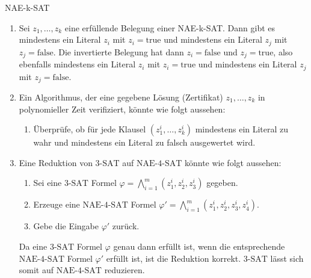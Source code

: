 \documentclass{article}
\begin{document}
\begin{exercise}{NAE-k-SAT}
  \begin{solution}
    \begin{enumerate}
      \item Sei $z_1, \ldots, z_k$ eine erfüllende Belegung einer NAE-k-SAT. Dann gibt es mindestens ein Literal $z_i$ mit $z_i = \text{true}$ und mindestens ein Literal $z_j$ mit $z_j = \text{false}$. Die invertierte Belegung hat dann $z_i = \text{false}$ und $z_j = \text{true}$, also ebenfalls mindestens ein Literal $z_i$ mit $z_i = \text{true}$ und mindestens ein Literal $z_j$ mit $z_j = \text{false}$.
      \item Ein Algorithmus, der eine gegebene Lösung (Zertifikat) $z_1, \ldots, z_k$ in polynomieller Zeit verifiziert, könnte wie folgt aussehen:
            \begin{enumerate}
              \item Überprüfe, ob für jede Klausel $(z_1^i, \dots, z_k^i)$ mindestens ein Literal zu wahr und mindestens ein Literal zu falsch ausgewertet wird.
            \end{enumerate}
      \item Eine Reduktion von $3\text{-SAT}$ auf $\text{NAE-4-SAT}$ könnte wie folgt aussehen:
            \begin{enumerate}
              \item Sei eine $3\text{-SAT}$ Formel $\varphi = \bigwedge_{i=1}^m (z_1^i, z_2^i, z_3^i)$ gegeben.
              \item Erzeuge eine $\text{NAE-4-SAT}$ Formel $\varphi' = \bigwedge_{i=1}^m (z_1^i, z_2^i, z_3^i, z_4^i)$.
              \item Gebe die Eingabe $\varphi'$ zurück.
            \end{enumerate}
            Da eine $3\text{-SAT}$ Formel $\varphi$ genau dann erfüllt ist, wenn die entsprechende $\text{NAE-4-SAT}$ Formel $\varphi'$ erfüllt ist, ist die Reduktion korrekt. $3\text{-SAT}$ lässt sich somit auf $\text{NAE-4-SAT}$ reduzieren.
    \end{enumerate}
  \end{solution}
\end{exercise}
\end{document}
